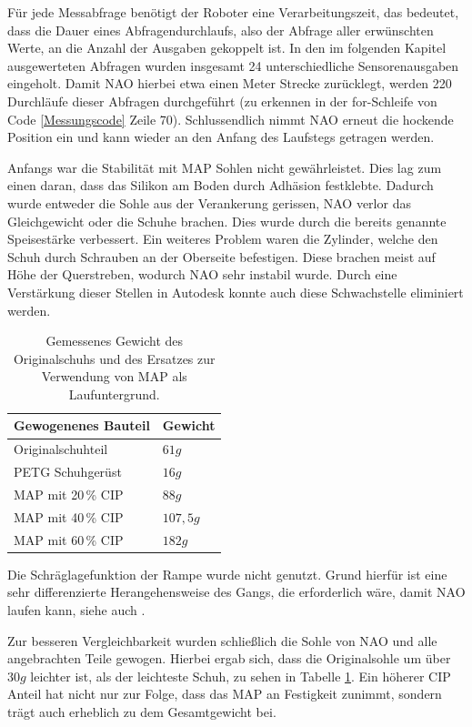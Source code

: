 Für jede Messabfrage benötigt der Roboter eine Verarbeitungszeit, das bedeutet, dass die Dauer eines Abfragendurchlaufs, also der Abfrage aller erwünschten Werte, an die Anzahl der Ausgaben gekoppelt ist. In den im folgenden Kapitel ausgewerteten Abfragen wurden insgesamt 24 unterschiedliche Sensorenausgaben eingeholt. Damit NAO hierbei etwa einen Meter Strecke zurücklegt, werden 220 Durchläufe dieser Abfragen durchgeführt (zu erkennen in der for-Schleife von Code \ref{Messungscode} Zeile 70). Schlussendlich nimmt NAO erneut die hockende Position ein und kann wieder an den Anfang des Laufstegs getragen werden. 

Anfangs war die Stabilität mit MAP Sohlen nicht gewährleistet. Dies lag zum einen daran, dass das Silikon am Boden durch Adhäsion festklebte. Dadurch wurde entweder die Sohle aus der Verankerung gerissen, NAO verlor das Gleichgewicht oder die Schuhe brachen. Dies wurde durch die bereits genannte Speisestärke verbessert. Ein weiteres Problem waren die Zylinder, welche den Schuh durch Schrauben an der Oberseite befestigen. Diese brachen meist auf Höhe der Querstreben, wodurch NAO sehr instabil wurde. Durch eine Verstärkung dieser Stellen in Autodesk konnte auch diese Schwachstelle eliminiert werden. 

\begin{table}
	\vspace{-0.8cm}
	\caption{Gemessenes Gewicht des Originalschuhs und des Ersatzes zur Verwendung von MAP als Laufuntergrund.}\label{gewicht}
	\begin{tabular}{ll}\\\toprule  
		Gewogenenes Bauteil & Gewicht \\\midrule
		Originalschuhteil & $61 \unit{g}$ \\  \midrule
		PETG Schuhgerüst &$16 \unit{g}$ \\  \midrule
		MAP mit 20\,\% CIP &$88 \unit{g}$ \\  \midrule
		MAP mit 40\,\% CIP &$107,5 \unit{g}$ \\  \midrule
		MAP mit 60\,\% CIP &$182 \unit{g}$ \\  \bottomrule
	\end{tabular}
    \vspace{-2cm}
\end{table} 

Die Schräglagefunktion der Rampe wurde nicht genutzt. Grund hierfür ist eine sehr differenzierte Herangehensweise des Gangs, die erforderlich wäre, damit NAO laufen kann, siehe auch \cite{Lutz_naowalking}.

Zur besseren Vergleichbarkeit wurden schließlich die Sohle von NAO und alle angebrachten Teile gewogen. Hierbei ergab sich, dass die Originalsohle um über $30\unit{g}$ leichter ist, als der leichteste Schuh, zu sehen in Tabelle \ref{gewicht}. Ein höherer CIP Anteil hat nicht nur zur Folge, dass das MAP an Festigkeit zunimmt, sondern trägt auch erheblich zu dem Gesamtgewicht bei. 


